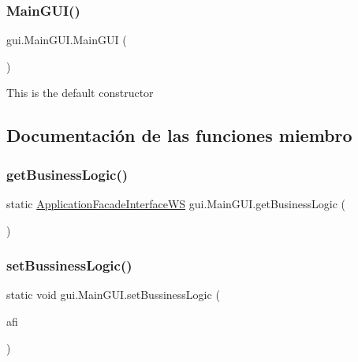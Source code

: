 \subsubsection{\texorpdfstring{MainGUI()}{MainGUI()}}
{\footnotesize\ttfamily gui.\+Main\+G\+U\+I.\+Main\+G\+UI (\begin{DoxyParamCaption}{ }\end{DoxyParamCaption})}

This is the default constructor 

\subsection{Documentación de las funciones miembro}
\mbox{\label{classgui_1_1_main_g_u_i_a037b3ca54b0c61d6899721ff55cca365}} 
\subsubsection{\texorpdfstring{getBusinessLogic()}{getBusinessLogic()}}
{\footnotesize\ttfamily static \mbox{\hyperlink{interfacebusiness_logic_1_1_application_facade_interface_w_s}{Application\+Facade\+Interface\+WS}} gui.\+Main\+G\+U\+I.\+get\+Business\+Logic (\begin{DoxyParamCaption}{ }\end{DoxyParamCaption})\hspace{0.3cm}{\ttfamily [static]}}

\mbox{\label{classgui_1_1_main_g_u_i_a306310290095fdaa31a668470fd6380d}} 
\subsubsection{\texorpdfstring{setBussinessLogic()}{setBussinessLogic()}}
{\footnotesize\ttfamily static void gui.\+Main\+G\+U\+I.\+set\+Bussiness\+Logic (\begin{DoxyParamCaption}\item[{\mbox{\hyperlink{interfacebusiness_logic_1_1_application_facade_interface_w_s}{Application\+Facade\+Interface\+WS}}}]{afi }\end{DoxyParamCaption})\hspace{0.3cm}{\ttfamily [static]}}



